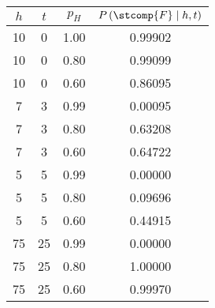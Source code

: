 
\begin{tabular}{c c c c}
\hline
$h$ & $t$ & $p_{H}$ & $P\left(\stcomp{F} \mid h,t\right)$ \\
\hline
\hline
10 & 0 & 1.00 & 0.99902 \\
10 & 0 & 0.80 & 0.99099 \\
10 & 0 & 0.60 & 0.86095 \\
\hline
7 & 3 & 0.99 & 0.00095 \\
7 & 3 & 0.80 & 0.63208 \\
7 & 3 & 0.60 & 0.64722 \\
\hline
5 & 5 & 0.99 & 0.00000 \\
5 & 5 & 0.80 & 0.09696 \\
5 & 5 & 0.60 & 0.44915 \\
\hline
75 & 25 & 0.99 & 0.00000 \\
75 & 25 & 0.80 & 1.00000 \\
75 & 25 & 0.60 & 0.99970 \\
\hline
\end{tabular}